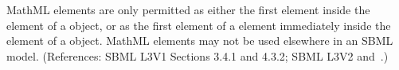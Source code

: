 MathML  elements are only permitted as either the first
element inside the  element of a \FunctionDefinition object, or
as the first element of a  element immediately inside the
 element of a \FunctionDefinition object.  MathML
 elements may not be used elsewhere in an SBML model.
(References: SBML L3V1 Sections 3.4.1 and 4.3.2; SBML L3V2 
and~.)

